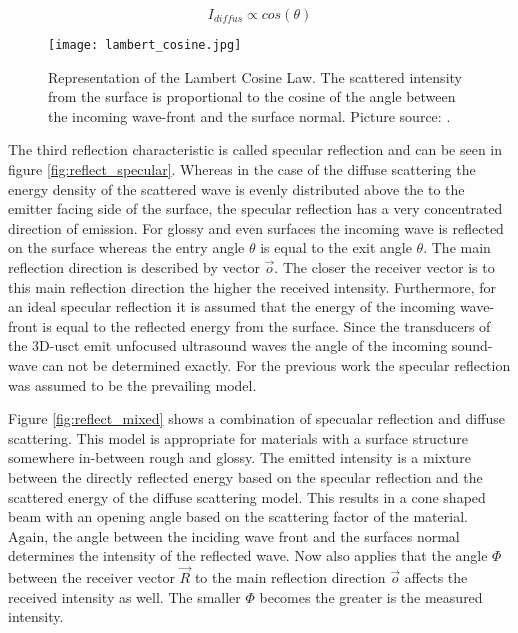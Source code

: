 \begin{equation}
I_{diffus} \propto cos(\theta)
\label{eq:lambert_cosine}
\end{equation}



\begin{figure}[H]
    \centering
    \texttt{[image: lambert\_cosine.jpg]}
    \caption{Representation of the Lambert Cosine Law. The scattered intensity from the surface is proportional to the cosine of the angle between the incoming wave-front and the surface normal. Picture source: \cite{illum_Phong}.}
    \label{Lambert_cosine_law}
\end{figure}


The third reflection characteristic is called specular reflection and can be seen in figure \ref{fig:reflect_specular}. Whereas in the case of the diffuse scattering the energy density of the scattered wave is evenly distributed above the to the emitter facing side of the surface, the specular reflection has a very concentrated direction of emission. For glossy and even surfaces the incoming wave is reflected on the surface whereas the entry angle  $\theta$ is equal to the exit angle $\theta$.
The main reflection direction is described by vector $\overrightarrow{o}$. The closer the receiver vector is to this main reflection direction the higher the received intensity. 
Furthermore, for an ideal specular reflection it is assumed that the energy of the incoming wave-front is equal to the reflected energy from the surface. Since the transducers of the 3D-\ac{usct} emit unfocused ultrasound waves the angle of the incoming sound-wave can not be determined exactly. For the previous work \cite{PatrickHucker2014EvaluationRuckstreumodells} the specular reflection was assumed to be the prevailing model.


Figure \ref{fig:reflect_mixed} shows a combination of specualar reflection and diffuse scattering. This model is appropriate for materials with a surface structure somewhere in-between rough and glossy. The emitted intensity is a mixture between the directly reflected energy based on the specular reflection and the scattered energy of the diffuse scattering model. This results in a cone shaped beam with an opening angle based on the scattering factor of the material. Again, the angle between the inciding wave front and the surfaces normal determines the intensity of the reflected wave. Now also applies that the angle $\Phi$  between the receiver vector $\overrightarrow{R}$ to the main reflection direction $\overrightarrow{o}$ affects the received intensity as well. The smaller $\Phi$ becomes the greater is the measured intensity.







